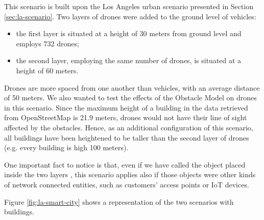 		
		This scenario is built upon the Los Angeles urban scenario presented in Section \ref{sec:la-scenario}. Two layers of drones were added to the ground level of vehicles: 
		\begin{itemize}
			\item the first layer is situated at a height of 30 meters from ground level and employs 732 drones;
			\item the second layer, employing the same number of drones, is situated at a height of 60 meters.
		\end{itemize}
		Drones are more spaced from one another than vehicles, with an average distance of 50 meters. We also wanted to test the effects of the Obstacle Model on drones in this scenario. Since the maximum height of a building in the data retrieved from OpenStreetMap is 21.9 meters, drones would not have their line of sight affected by the obstacles. Hence, as an additional configuration of this scenario, all buildings have been heightened to be taller than the second layer of drones (e.g. every building is high 100 meters). 
		
		
		One important fact to notice is that, even if we have called the object placed inside the two layers , this scenario applies also if those objects were other kinds of network connected entities, such as customers' access points or IoT devices.
		
		Figure \ref{fig:la-smart-city} shows a representation of the two scenarios with buildings.
		
